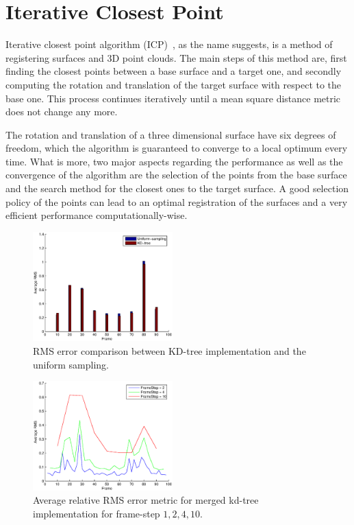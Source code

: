 \section{Iterative Closest Point}
\label{icp}

Iterative closest point algorithm (ICP)~\cite{icpOr}, as the name suggests, is a method of registering surfaces and 3D point clouds. The main steps of this method are, first finding the closest points between a base surface and a target one, and secondly computing the rotation and translation of the target surface with respect to the base one. This process continues iteratively until a mean square distance metric does not change any more.

The rotation and translation of a three dimensional surface have six degrees of freedom, which the algorithm is guaranteed to converge to a local optimum every time. What is more, two major aspects regarding the performance as well as the convergence of the algorithm are the selection of the points from the base surface and the search method for the closest ones to the target surface. A good selection policy of the points can lead to an optimal registration of the surfaces and a very efficient performance computationally-wise.

\begin{figure}[bt!]
  \centering
    \includegraphics[width=0.48\textwidth]{figures/comparison.eps}
    \caption{RMS error comparison between KD-tree implementation and the uniform sampling.}
    \label{fig:comparison}
\end{figure}

\begin{figure}[t!]
  \centering
    \includegraphics[width=0.48\textwidth]{figures/RMSmergedKD.eps}
    \caption{Average relative RMS error metric for merged kd-tree implementation for frame-step $1,2,4,10$.}
    \label{fig:rmsmergederror}
\end{figure}

